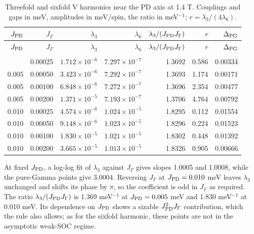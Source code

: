 \begin{longtable}[]{@{}rrrrrrr@{}}
\toprule\noalign{}
\(J_{\rm PD}\) & \(J_\Gamma\) & \(\lambda_3\) & \(\lambda_6\) &
\(\lambda_3/(J_{\rm PD}J_\Gamma)\) & \(r\) & \(\Delta_{\rm PG}\) \\
\midrule\noalign{}
\endfirsthead
\toprule\noalign{}
\(J_{\rm PD}\) & \(J_\Gamma\) & \(\lambda_3\) & \(\lambda_6\) &
\(\lambda_3/(J_{\rm PD}J_\Gamma)\) & \(r\) & \(\Delta_{\rm PG}\) \\
\midrule\noalign{}
\endhead
\bottomrule\noalign{}
\caption{Threefold and sixfold V harmonics near the PD axis at 1.4 T.
Couplings and gaps in meV, amplitudes in meV/spin, the ratio in
meV\(^{-1}\); \(r=\lambda_3/(4\lambda_6)\).}\label{tab-nbcp-v-mixed-soc}\\
\endlastfoot
0.005 & 0.00025 & \(1.712\times10^{-6}\) & \(7.297\times10^{-7}\) & 1.3692 & 0.586 & 0.00334 \\
0.005 & 0.00050 & \(3.423\times10^{-6}\) & \(7.292\times10^{-7}\) & 1.3693 & 1.174 & 0.00171 \\
0.005 & 0.00100 & \(6.848\times10^{-6}\) & \(7.272\times10^{-7}\) & 1.3696 & 2.354 & 0.00477 \\
0.005 & 0.00200 & \(1.371\times10^{-5}\) & \(7.193\times10^{-7}\) & 1.3706 & 4.764 & 0.00792 \\
0.010 & 0.00025 & \(4.574\times10^{-6}\) & \(1.024\times10^{-5}\) & 1.8295 & 0.112 & 0.01554 \\
0.010 & 0.00050 & \(9.148\times10^{-6}\) & \(1.023\times10^{-5}\) & 1.8296 & 0.224 & 0.01523 \\
0.010 & 0.00100 & \(1.830\times10^{-5}\) & \(1.021\times10^{-5}\) & 1.8302 & 0.448 & 0.01392 \\
0.010 & 0.00200 & \(3.665\times10^{-5}\) & \(1.013\times10^{-5}\) & 1.8326 & 0.905 & 0.00666 \\
\end{longtable}

At fixed \(J_{\rm PD}\), a log-log fit of \(\lambda_3\) against
\(J_\Gamma\) gives slopes 1.0005 and 1.0008, while the pure-Gamma points
give 3.0004. Reversing \(J_\Gamma\) at \(J_{\rm PD}=0.010\) meV leaves
\(\lambda_3\) unchanged and shifts its phase by \(\pi\), so the coefficient
is odd in \(J_\Gamma\) as required. The ratio
\(\lambda_3/(J_{\rm PD}J_\Gamma)\) is 1.369 meV\(^{-1}\) at
\(J_{\rm PD}=0.005\) meV and 1.830 meV\(^{-1}\) at 0.010 meV. Its
dependence on \(J_{\rm PD}\) shows a sizable \(J_{\rm PD}^2J_\Gamma\)
contribution, which the rule also allows; as for the sixfold harmonic,
these points are not in the asymptotic weak-SOC regime.

